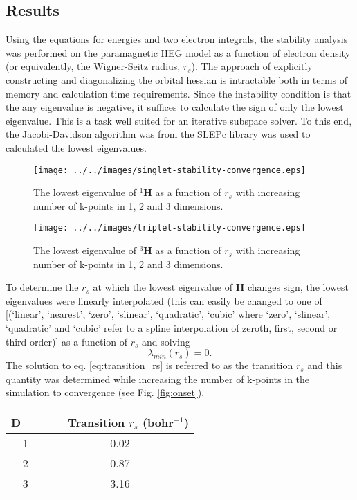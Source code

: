 \documentclass[preprint, journal=prl]{revtex4-1}
\begin{document}
\subsection{Results}   
  Using the equations for energies and two electron integrals, the stability analysis was performed on the paramagnetic HEG model as a function of electron density (or equivalently, the Wigner-Seitz radius, $r_s$). The approach of explicitly constructing and diagonalizing the orbital hessian is intractable both in terms of memory and calculation time requirements. Since the instability condition is that the any eigenvalue is negative, it suffices to calculate the sign of only the lowest eigenvalue. This is a task well suited for an iterative subspace solver. To this end, the Jacobi-Davidson algorithm was from the SLEPc library was used to calculated the lowest eigenvalues\cite{Hernandez2005}. 
  
  \begin{figure}
    \centering
    \texttt{[image: ../../images/singlet-stability-convergence.eps]}
    \caption{The lowest eigenvalue of ${}^1\mathbf{H}$ as a function of $r_s$ with increasing number of k-points in 1, 2 and 3 dimensions.}
    \label{fig:singlet_convergence}
  \end{figure}
  \begin{figure}
    \centering
    \texttt{[image: ../../images/triplet-stability-convergence.eps]}
    \caption{The lowest eigenvalue of ${}^3\mathbf{H}$ as a function of $r_s$ with increasing number of k-points in 1, 2 and 3 dimensions.}
    \label{fig:triplet_convergence}
  \end{figure}
  To determine the $r_s$ at which the lowest eigenvalue of $\mathbf{H}$ changes sign, the lowest eigenvalues were linearly interpolated  {\color{red} (this can easily be changed to one of [(‘linear’, ‘nearest’, ‘zero’, ‘slinear’, ‘quadratic’, ‘cubic’ where ‘zero’, ‘slinear’, ‘quadratic’ and ‘cubic’ refer to a spline interpolation of zeroth, first, second or third order)]} as a function of $r_s$ and solving
  \begin{equation} \label{eq:transition_rs}
    \lambda_{min}(r_s) = 0.
  \end{equation}
  The solution to eq. \ref{eq:transition_rs} is referred to as the transition $r_s$ and this quantity was determined while increasing the number of k-points in the simulation to convergence (see Fig. \ref{fig:onset}).
  
  \begin{tabular}{ c | c }\label{table:transition_rs}
    D~~~ & ~~ Transition $r_s$ (bohr$^{-1}$) \\
    \hline
    1    &  0.02 \\
    2    &  0.87 \\
    3    &  3.16 \\
    \hline
  \end{tabular}
  
\end{document}
